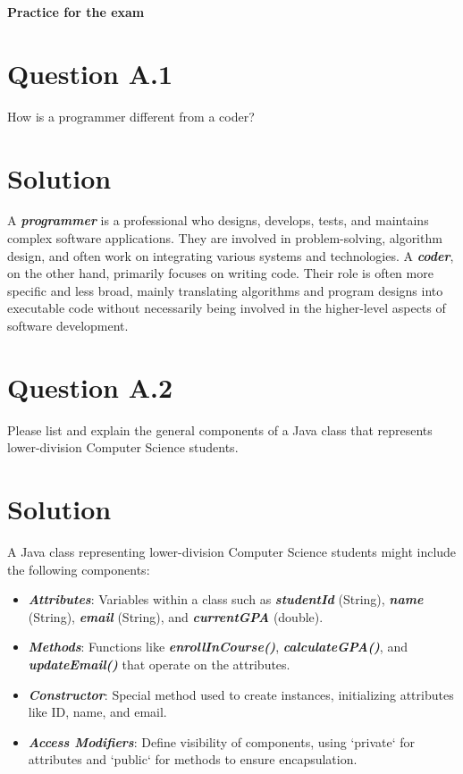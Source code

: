 \documentclass[12pt]{article}
\begin{document}
\begin{center}
  \Large \textbf{Practice for the exam}
\end{center}

\section*{Question A.1}
How is a programmer different from a coder?

\section*{Solution}
A \textbf{\textit{programmer}} is a professional who designs, develops, tests, and maintains complex software applications. They are involved in problem-solving, algorithm design, and often work on integrating various systems and technologies. A \textbf{\textit{coder}}, on the other hand, primarily focuses on writing code. Their role is often more specific and less broad, mainly translating algorithms and program designs into executable code without necessarily being involved in the higher-level aspects of software development.

\section*{Question A.2}
Please list and explain the general components of a Java class that represents lower-division Computer Science students.

\section*{Solution}
A Java class representing lower-division Computer Science students might include the following components:
\begin{itemize}
  \item \textbf{\textit{Attributes}}: Variables within a class such as \textbf{\textit{studentId}} (String), \textbf{\textit{name}} (String), \textbf{\textit{email}} (String), and \textbf{\textit{currentGPA}} (double).
  \item \textbf{\textit{Methods}}: Functions like \textbf{\textit{enrollInCourse()}}, \textbf{\textit{calculateGPA()}}, and \textbf{\textit{updateEmail()}} that operate on the attributes.
  \item \textbf{\textit{Constructor}}: Special method used to create instances, initializing attributes like ID, name, and email.
  \item \textbf{\textit{Access Modifiers}}: Define visibility of components, using `private` for attributes and `public` for methods to ensure encapsulation.
\end{itemize}
\end{document}
